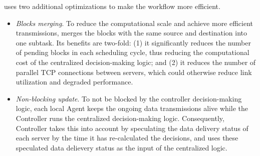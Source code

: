 \name uses two additional optimizations to make the workflow
more efficient.
\begin{itemize}
\item \emph{Blocks merging}.
To reduce the computational scale and achieve more efficient
transmissions, \name merges the blocks with the same source and
destination into one subtask. Its benefits are two-fold: (1) it
significantly reduces the number of pending blocks in each
scheduling cycle, thus reducing the computational cost of the
centralized decision-making logic; and (2) it reduces the number
of parallel TCP connections between servers, which could
otherwise reduce link utilization and degraded performance.
\item \emph{Non-blocking update}.
To not be blocked by the controller decision-making logic, each
local Agent  keeps the ongoing data transmissions alive while the
Controller runs the centralized decision-making logic.
Consequently, Controller takes this into account by speculating the
data delivery status of each server by the time it has re-calculated
the decisions, and uses these speculated data delievery status as
the input of the centralized logic.
\end{itemize}

%
%
%
%

